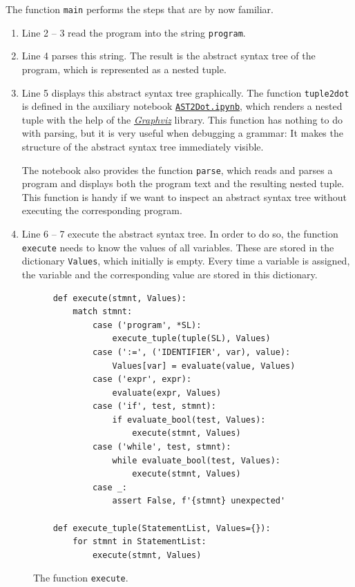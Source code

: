 \noindent
The function \texttt{main} performs the steps that are by now familiar.
\begin{enumerate}
\item Line 2 -- 3 read the program into the string \texttt{program}.
\item Line 4 parses this string.  The result is the abstract syntax tree of the program, which is represented
      as a nested tuple.
\item Line 5 displays this abstract syntax tree graphically.  The function \texttt{tuple2dot} is defined in
      the auxiliary notebook
      \href{https://github.com/karlstroetmann/Formal-Languages/blob/master/Python/Chapter-08/AST2Dot.ipynb}{\texttt{AST2Dot.ipynb}},
      which renders a nested tuple with the help of the
      \href{https://graphviz.org}{\textsl{Graphviz}} library.  This function has nothing to do with
      parsing, but it is very useful when debugging a grammar:  It makes the structure of the abstract
      syntax tree immediately visible.

      The notebook also provides the function \texttt{parse}, which reads and parses a program and displays
      both the program text and the resulting nested tuple.  This function is handy if we want to inspect an
      abstract syntax tree without executing the corresponding program.
\item Line 6 -- 7 execute the abstract syntax tree.  In order to do so, the function \texttt{execute} needs
      to know the values of all variables.  These are stored in the dictionary \texttt{Values}, which
      initially is empty.  Every time a variable is assigned, the variable and the corresponding value are
      stored in this dictionary.
\end{enumerate}

\begin{figure}[!ht]
\centering
\begin{verbatim}
    def execute(stmnt, Values):
        match stmnt:
            case ('program', *SL):
                execute_tuple(tuple(SL), Values)
            case (':=', ('IDENTIFIER', var), value):
                Values[var] = evaluate(value, Values)
            case ('expr', expr):
                evaluate(expr, Values)
            case ('if', test, stmnt):
                if evaluate_bool(test, Values):
                    execute(stmnt, Values)
            case ('while', test, stmnt):
                while evaluate_bool(test, Values):
                    execute(stmnt, Values)
            case _:
                assert False, f'{stmnt} unexpected'

    def execute_tuple(StatementList, Values={}):
        for stmnt in StatementList:
            execute(stmnt, Values)
\end{verbatim}
\vspace*{-0.3cm}
\caption{The function \texttt{execute}.}
\label{fig:Interpreter.ipynb:execute}
\end{figure}

